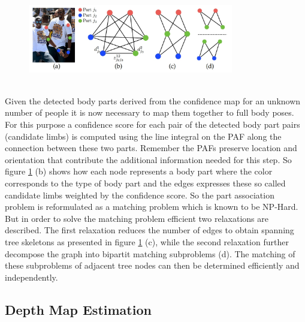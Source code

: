 \begin{figure}[h]
	\centering
	\includegraphics[width=0.8\textwidth]{./images/part_association.jpg}
	\label{fig:openpose_mapping}
\end{figure}\\
Given the detected body parts derived from the confidence map for an unknown number of people it is now necessary to map them together to full body poses. For this purpose a confidence score for each pair of the detected body part pairs (candidate limbs) is computed using the line integral on the PAF along the connection between these two parts. Remember the PAFs preserve location and orientation that contribute the additional information needed for this step. So figure \ref{fig:openpose_mapping} (b) shows how each node represents a body part where the color corresponds to the type of body part and the edges expresses these so called candidate limbs weighted by the confidence score. So the part association problem is reformulated as a matching problem which is known to be NP-Hard. But in order to solve the matching problem efficient two relaxations are described. The first relaxation reduces the number of edges to obtain spanning tree skeletons as presented in figure \ref{fig:openpose_mapping} (c), while the second relaxation further decompose the graph into bipartit matching subproblems (d). The matching of these subproblems of adjacent tree nodes can then be determined efficiently and independently. 


\subsection{Depth Map Estimation}


